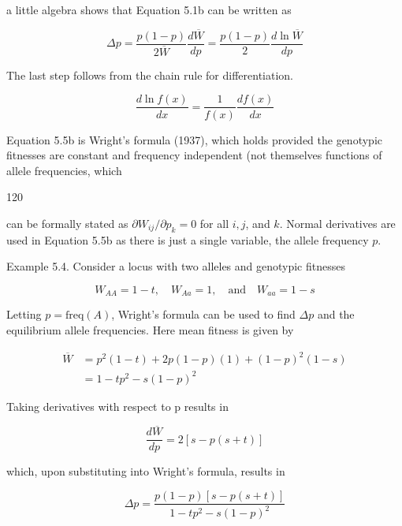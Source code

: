 \documentclass{article}
\begin{document}
a little algebra shows that Equation 5.1b can be written as

\begin{equation}
\Delta p=\frac{p(1-p)}{2\overline{W}}\frac{d\overline{W}}{dp}=\frac{p(1-p)}{2}\frac{d\ln\overline{W}}{dp}
\tag{5.5b}
\label{eq:5_5b}
\end{equation}

The last step follows from the chain rule for differentiation.

\begin{equation}
\frac{d\ln f(x)}{dx}=\frac{1}{f(x)}\frac{df(x)}{dx}
\end{equation}

Equation 5.5b is Wright's formula (1937), which holds provided the genotypic fitnesses are constant and frequency independent (not themselves functions of allele frequencies, which

120

can be formally stated as  $ \partial W_{ij}/\partial p_k = 0 $ for all  $ i, j $, and  $ k $. Normal derivatives are used in Equation 5.5b as there is just a single variable, the allele frequency  $ p $.

Example 5.4. Consider a locus with two alleles and genotypic fitnesses

\begin{equation}
W_{A A}=1-t,\quad W_{A a}=1,\quad\mathrm{a n d}\quad W_{a a}=1-s
\end{equation}

Letting  $ p = \text{freq}(A) $, Wright's formula can be used to find  $ \Delta p $ and the equilibrium allele frequencies. Here mean fitness is given by

\begin{equation}
\begin{aligned}\overline{W}&=p^{2}(1-t)+2p(1-p)(1)+(1-p)^{2}(1-s)\\&=1-tp^{2}-s(1-p)^{2}\end{aligned}
\end{equation}

Taking derivatives with respect to p results in

\begin{equation}
\frac{d\overline{W}}{dp}=2[s-p(s+t)]
\end{equation}

which, upon substituting into Wright's formula, results in

\begin{equation}
\Delta p=\frac{p(1-p)[s-p(s+t)]}{1-tp^{2}-s(1-p)^{2}}
\end{equation}
\end{document}
